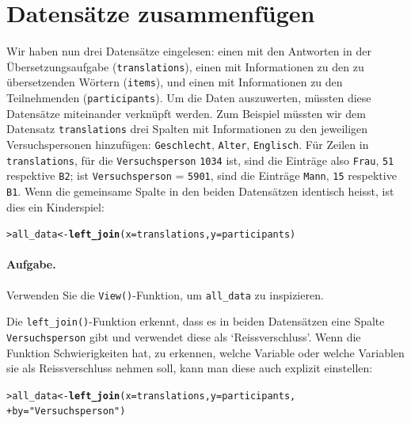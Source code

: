 \documentclass[oneside, 10pt]{book}\usepackage[]{graphicx}\usepackage[]{xcolor}
\makeatletter
\newcommand{\hlstr}[1]{\textcolor[rgb]{0.192,0.494,0.8}{#1}}%
\newcommand{\hlstd}[1]{\textcolor[rgb]{0.345,0.345,0.345}{#1}}%
\newcommand{\hlkwb}[1]{\textcolor[rgb]{0.69,0.353,0.396}{#1}}%
\newcommand{\hlkwc}[1]{\textcolor[rgb]{0.333,0.667,0.333}{#1}}%
\newcommand{\hlkwd}[1]{\textcolor[rgb]{0.737,0.353,0.396}{\textbf{#1}}}%
\newenvironment{kframe}{%
 \def\at@end@of@kframe{}%
 \ifinner\ifhmode%
  \def\at@end@of@kframe{\end{minipage}}%
  \begin{minipage}{\columnwidth}%
 \fi\fi%
 \def\FrameCommand##1{\hskip\@totalleftmargin \hskip-\fboxsep
 \colorbox{shadecolor}{##1}\hskip-\fboxsep
     \hskip-\linewidth \hskip-\@totalleftmargin \hskip\columnwidth}%
 \MakeFramed {\advance\hsize-\width
   \@totalleftmargin\z@ \linewidth\hsize
   \@setminipage}}%
 {\par\unskip\endMakeFramed%
 \at@end@of@kframe}
\newenvironment{knitrout}{}{} %
\makeatother
\begin{document}
\section{Datensätze zusammenfügen}\label{sec:join}
Wir haben nun drei Datensätze eingelesen: 
einen mit den Antworten in der Übersetzungsaufgabe
(\texttt{translations}),
einen mit Informationen zu den zu übersetzenden Wörtern
(\texttt{items}),
und einen mit Informationen zu den Teilnehmenden
(\texttt{participants}).
Um die Daten auszuwerten, müssten diese Datensätze miteinander verknüpft werden.
Zum Beispiel müssten wir dem Datensatz \texttt{translations} 
drei Spalten mit Informationen zu den jeweiligen Versuchspersonen hinzufügen:
\texttt{Geschlecht}, \texttt{Alter}, \texttt{Englisch}.
Für Zeilen in \texttt{translations},
für die \texttt{Versuchsperson} \texttt{1034} ist, 
sind die Einträge also \texttt{Frau}, \texttt{51} respektive \texttt{B2};
ist \texttt{Versuchsperson} = \texttt{5901},
sind die Einträge \texttt{Mann}, \texttt{15} respektive \texttt{B1}.
Wenn die gemeinsame Spalte in den beiden Datensätzen identisch heisst,
ist dies ein Kinderspiel:
\begin{knitrout}
\color{fgcolor}\begin{kframe}
\begin{alltt}
\hlstd{> }\hlstd{all_data} \hlkwb{<-} \hlkwd{left_join}\hlstd{(}\hlkwc{x} \hlstd{= translations,} \hlkwc{y} \hlstd{= participants)}
\end{alltt}


{\ttfamily\noindent\itshape{}}\end{kframe}
\end{knitrout}

\paragraph{Aufgabe.} Verwenden Sie die \texttt{View()}-Funktion,
um \texttt{all\_data} zu inspizieren.

Die \texttt{left\_join()}-Funktion erkennt, dass es in beiden Datensätzen
eine Spalte \texttt{Versuchsperson} gibt und
verwendet diese als `Reissverschluss'. Wenn die Funktion
Schwierigkeiten hat, zu erkennen, welche Variable oder welche
Variablen sie als Reissverschluss nehmen soll, kann man diese auch
explizit einstellen:
\begin{knitrout}
\color{fgcolor}\begin{kframe}
\begin{alltt}
\hlstd{> }\hlstd{all_data} \hlkwb{<-} \hlkwd{left_join}\hlstd{(}\hlkwc{x} \hlstd{= translations,} \hlkwc{y} \hlstd{= participants,}
\hlstd{+ }                      \hlkwc{by} \hlstd{=} \hlstr{"Versuchsperson"}\hlstd{)}
\end{alltt}
\end{kframe}
\end{knitrout}
\end{document}
